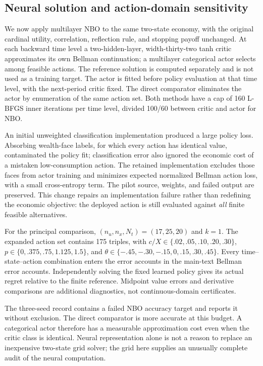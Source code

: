 \subsection{Neural solution and action-domain sensitivity}\label{sec:ndu-neural-r6-history}
We now apply multilayer NBO to the same two-state economy, with the original cardinal utility, correlation, reflection rule, and stopping payoff unchanged. At each backward time level a two-hidden-layer, width-thirty-two tanh critic approximates its own Bellman continuation; a multilayer categorical actor selects among feasible actions. The reference solution is computed separately and is not used as a training target. The actor is fitted before policy evaluation at that time level, with the next-period critic fixed. The direct comparator eliminates the actor by enumeration of the same action set. Both methods have a cap of 160 L-BFGS inner iterations per time level, divided 100/60 between critic and actor for NBO.

An initial unweighted classification implementation produced a large policy loss. Absorbing wealth-face labels, for which every action has identical value, contaminated the policy fit; classification error also ignored the economic cost of a mistaken low-consumption action. The retained implementation excludes those faces from actor training and minimizes expected normalized Bellman action loss, with a small cross-entropy term. The pilot source, weights, and failed output are preserved. This change repairs an implementation failure rather than redefining the economic objective: the deployed action is still evaluated against \emph{all} finite feasible alternatives.

For the principal comparison, $(n_u,n_x,N_t)=(17,25,20)$ and $k=1$. The expanded action set contains 175 triples, with $c/X\in\{.02,.05,.10,.20,.30\}$, $p\in\{0,.375,.75,1.125,1.5\}$, and $\theta\in\{-.45,-.30,-.15,0,.15,.30,.45\}$. Every time--state--action combination enters the error accounts in the main-text Bellman error accounts. Independently solving the fixed learned policy gives its actual regret relative to the finite reference. Midpoint value errors and derivative comparisons are additional diagnostics, not continuous-domain certificates.

The three-seed record contains a failed NBO accuracy target and reports it without exclusion. The direct comparator is more accurate at this budget. A categorical actor therefore has a measurable approximation cost even when the critic class is identical. Neural representation alone is not a reason to replace an inexpensive two-state grid solver; the grid here supplies an unusually complete audit of the neural computation.

